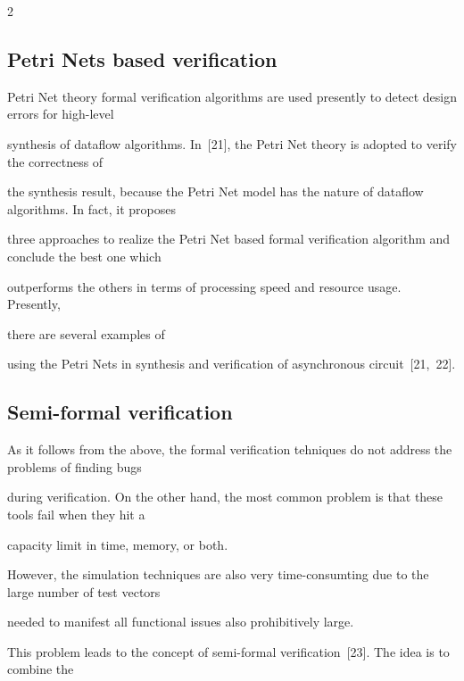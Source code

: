 \begin{multicols}{2}
\subsection{Petri Nets based verification} %





  \noindent


Petri Net theory formal verification algorithms are used presently to detect design errors for high-level


synthesis of dataflow algorithms. In~[21], the Petri Net theory is adopted to verify the correctness of


the synthesis result, because the Petri Net model has the nature of dataflow algorithms. In fact, it proposes


three approaches to realize the Petri Net based formal verification algorithm and conclude the best one which


outperforms the others in terms of processing speed and resource usage. Presently,


there are several examples of


using the Petri Nets in synthesis and verification of asynchronous circuit~[21,~22].





\subsection{Semi-formal verification} %





   \noindent


As it follows from the above, the formal verification  tehniques do not address the problems of finding bugs


during verification. On the other hand, the most common problem is that these tools fail when they hit a


capacity limit in time, memory, or both.





   However, the simulation techniques are also very time-consumting due to the large number of test vectors


needed to manifest all functional issues also prohibitively large.





This problem leads to the concept of semi-formal verification~[23]. The idea is to combine the



\end{multicols}
